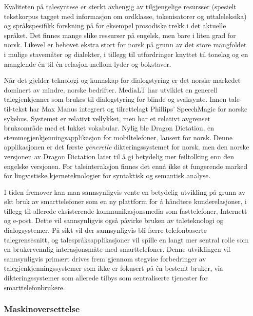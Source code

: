 \begin{multicols}{2}

Kvaliteten på talesyntese er sterkt avhengig av tilgjengelige resursser (spesielt tekstkorpus tagget med informasjon om ordklasse, tokenisatorer og uttaleleksika) og språkspesifikk forskning på for eksempel prosodiske trekk i det aktuelle språket. 
Det finnes mange slike ressurser på engelsk, men bare i liten grad for norsk. Likevel er behovet ekstra stort for norsk på grunn av det store mangfoldet i mulige stavemåter og dialekter, i tillegg til utfordringer knyttet til tonelag og en manglende én-til-én-relasjon mellom lyder og bokstaver.

Når det gjelder teknologi og kunnskap for dialogstyring er det norske markedet dominert av mindre, norske bedrifter. 
MediaLT har utviklet en generell talegjenkjenner som brukes til dialogstyring for blinde og svaksynte. 
Innen tale-til-tekst har Max Manus integrert og tilrettelagt Phillips’ SpeechMagic for norske sykehus. 
Systemet er relativt vellykket, men har et relativt avgrenset bruksområde med et lukket vokabular. 
Nylig ble Dragon Dictation, en stemmegjenkjenningsapplikasjon for mobiltelefoner, lansert for norsk. 
Denne applikasjonen er det første \textit{generelle} dikteringssystemet for norsk, men den norske versjonen av Dragon Dictation later til å gi betydelig mer feiltolking enn den engelske versjonen.
For taleinteraksjon finnes det ennå ikke et fungerende marked for lingvistiske kjerneteknologier for syntaktisk og semantisk analyse.

I tiden fremover kan man sannsynligvis vente en betydelig utvikling på grunn av økt bruk av smarttelefoner som en ny plattform for å håndtere kunderelasjoner, i tillegg til allerede eksisterende kommunikasjonsmedia som fasttelefoner, Internett og e-post.
Dette vil sannsynligvis også påvirke bruken av taleteknologi og dialogsystemer. På sikt vil der sannsynligvis bli færre telefonbaserte talegrensesnitt, og talespråksapplikasjoner vil spille en langt mer sentral rolle som en brukervennlig interasjonsmåte med smarttelefoner.
Denne utviklingen vil sannsynligvis primært drives frem gjennom stegvise forbedringer av talegjenkjenningssystemer som ikke er fokusert på én bestemt bruker, via dikteringssystemer som allerede tilbys som sentraliserte tjenester for smarttelefonbrukere.

\subsubsection{Maskinoversettelse}


\end{multicols}
